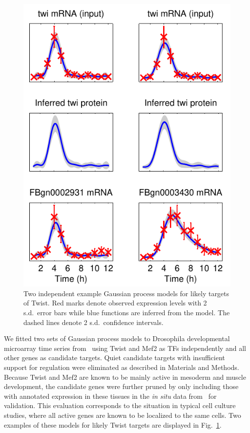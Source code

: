\documentclass{pnastwo}
\begin{document}
\begin{article}
\begin{figure}[htb]
  \centering
  \includegraphics{gpdisim_models_twi}
  \caption{Two independent example Gaussian process models for likely
    targets of Twist. Red marks denote observed expression levels with
    2 s.d.\ error bars while blue functions are inferred from the
    model.  The dashed lines denote 2 s.d.\ confidence intervals.}
  \label{fig:gpdisim_models}
\end{figure}

We fitted two sets of Gaussian process models to Drosophila
developmental microarray time series from~\cite{Tomancak2002} using
Twist and Mef2 as TFs independently and all other genes as candidate
targets.  Quiet candidate targets with insufficient support for
regulation were eliminated as described in Materials and Methods.
Because Twist and Mef2 are known to be mainly active in mesoderm and
muscle development, the candidate genes were further pruned by only
including those with annotated expression in these tissues in the
\emph{in situ} data from~\cite{Tomancak2002} for validation.
This evaluation corresponds to
the situation in typical cell culture studies, where all active genes
are known to be localized to the same cells.
Two
examples of these models for likely Twist targets are displayed in
Fig.~\ref{fig:gpdisim_models}.


\end{article}
\end{document}
